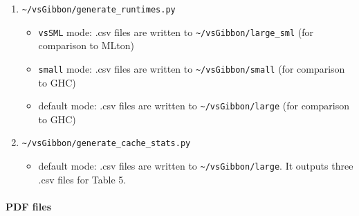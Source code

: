 \begin{enumerate}
\def\labelenumi{\arabic{enumi}.}
\tightlist
\item
  \texttt{\textasciitilde{}/vsGibbon/generate\_runtimes.py}

  \begin{itemize}
  \tightlist
  \item
    \texttt{vsSML} mode: .csv files are written to
    \texttt{\textasciitilde{}/vsGibbon/large\_sml} (for comparison to
    MLton)
  \item
    \texttt{small} mode: .csv files are written to
    \texttt{\textasciitilde{}/vsGibbon/small} (for comparison to GHC)
  \item
    default mode: .csv files are written to
    \texttt{\textasciitilde{}/vsGibbon/large} (for comparison to GHC)
  \end{itemize}
\item
  \texttt{\textasciitilde{}/vsGibbon/generate\_cache\_stats.py}

  \begin{itemize}
  \tightlist
  \item
    default mode: .csv files are written to
    \texttt{\textasciitilde{}/vsGibbon/large}. It outputs three .csv
    files for Table 5.
  \end{itemize}
\end{enumerate}

\hypertarget{pdf-files}{%
\paragraph{PDF files}\label{pdf-files}}

